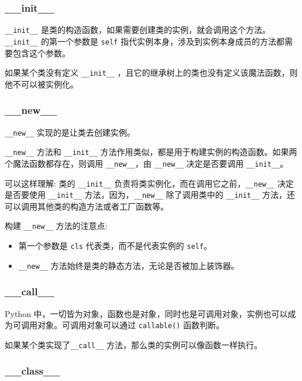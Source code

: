 \subsubsection{\_\_init\_\_}

\texttt{\_\_init\_\_} 是类的构造函数，如果需要创建类的实例，就会调用这个方法。\texttt{\_\_init\_\_} 的第一个参数是 \texttt{self} 指代实例本身，涉及到实例本身成员的方法都需要包含这个参数。 

如果某个类没有定义 \texttt{\_\_init\_\_} ，且它的继承树上的类也没有定义该魔法函数，则他不可以被实例化。 

\subsubsection{\_\_new\_\_}

\texttt{\_\_new\_\_} 实现的是让类去创建实例。

\texttt{\_\_new\_\_} 方法和 \texttt{\_\_init\_\_} 方法作用类似，都是用于构建实例的构造函数。如果两个魔法函数都存在，则调用 \texttt{\_\_new\_\_}，由 \texttt{\_\_new\_\_} 决定是否要调用 \texttt{\_\_init\_\_}。  

可以这样理解: 类的 \texttt{\_\_init\_\_} 负责将类实例化，而在调用它之前，\texttt{\_\_new\_\_} 决定是否要使用 \texttt{\_\_init\_\_} 方法，因为，\texttt{\_\_new\_\_} 除了调用类中的 \texttt{\_\_init\_\_} 方法，还可以调用其他类的构造方法或者工厂函数等。

构建 \texttt{\_\_new\_\_} 方法的注意点:
\begin{itemize}
    \item 第一个参数是 \texttt{cls} 代表类，而不是代表实例的 \texttt{self}。
    \item \texttt{\_\_new\_\_} 方法始终是类的静态方法，无论是否被加上装饰器。 
\end{itemize}

\subsubsection{\_\_call\_\_}

Python 中，一切皆为对象，函数也是对象，同时也是可调用对象，实例也可以成为可调用对象。可调用对象可以通过 \texttt{callable()} 函数判断。 

如果某个类实现了\texttt{\_\_call\_\_} 方法，那么类的实例可以像函数一样执行。

\subsubsection{\_\_class\_\_}


